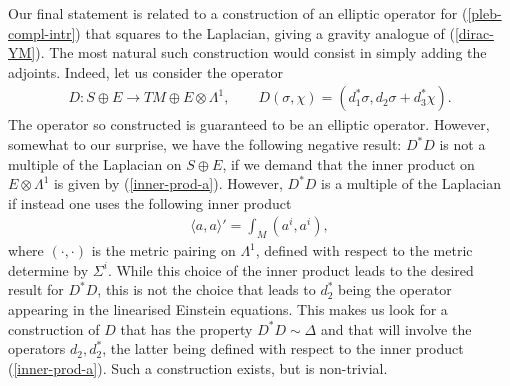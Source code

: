 \documentclass[10pt]{report}
\theoremstyle{definition}
\begin{document}
Our final statement is related to a construction of an elliptic operator for (\ref{pleb-compl-intr}) that squares to the Laplacian, giving a gravity analogue of (\ref{dirac-YM}). The most natural such construction would consist in simply adding the adjoints. Indeed, let us consider the operator
\begin{align}
D: S\oplus E \to TM \oplus E\otimes\Lambda^1, \qquad D(\sigma,\chi) = (d_1^*\sigma, d_2 \sigma + d_3^*\chi).
\end{align}
The operator so constructed is guaranteed to be an elliptic operator. However, somewhat to our surprise, we have the following negative result: $D^* D$ is not a multiple of the Laplacian on $S\oplus E$, if we demand that the inner product on $E\otimes\Lambda^1$ is given by (\ref{inner-prod-a}). However, $D^* D$ is a multiple of the Laplacian if instead one uses the following inner product
\begin{align}
\langle a,a\rangle' = \int_M (a^i,a^i),
\end{align}
where $(\cdot,\cdot)$ is the metric pairing on $\Lambda^1$, defined with respect to the metric determine by $\Sigma^i$. While this choice of the inner product leads to the desired result for $D^* D$, this is not the choice that leads to $d_2^*$ being the operator appearing in the linearised Einstein equations. This makes us look for a construction of $D$ that has the property $D^* D\sim \Delta$ and that will involve the operators $d_2, d_2^*$, the latter being defined with respect to the inner product (\ref{inner-prod-a}). Such a construction exists, but is non-trivial. 
\end{document}
